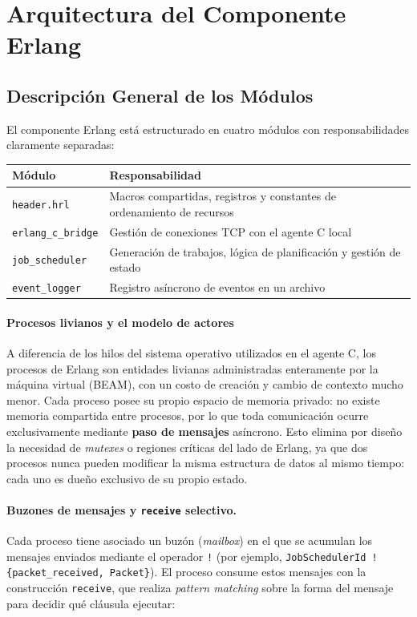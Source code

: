 \documentclass[12pt,a4paper]{article}
\begin{document}
\section{Arquitectura del Componente Erlang}

\subsection{Descripción General de los Módulos}
 
El componente Erlang está estructurado en cuatro módulos con responsabilidades claramente separadas:
 
\begin{center}
\begin{tabular}{ll}
\toprule
\textbf{Módulo} & \textbf{Responsabilidad} \\
\midrule
\texttt{header.hrl}         & Macros compartidas, registros y constantes de ordenamiento de recursos \\
\texttt{erlang\_c\_bridge}  & Gestión de conexiones TCP con el agente C local \\
\texttt{job\_scheduler}     & Generación de trabajos, lógica de planificación y gestión de estado \\
\texttt{event\_logger}      & Registro asíncrono de eventos en un archivo \\
\bottomrule
\end{tabular}
\end{center}

\paragraph{Procesos livianos y el modelo de actores}
A diferencia de los hilos del sistema operativo utilizados en el agente C, los procesos de Erlang son entidades livianas administradas enteramente por la máquina virtual (BEAM), con un costo de creación y cambio de contexto mucho menor. Cada proceso posee su propio espacio de memoria privado: no existe memoria compartida entre procesos, por lo que toda comunicación ocurre exclusivamente mediante \textbf{paso de mensajes} asíncrono. Esto elimina por diseño la necesidad de \emph{mutexes} o regiones críticas del lado de Erlang, ya que dos procesos nunca pueden modificar la misma estructura de datos al mismo tiempo: cada uno es dueño exclusivo de su propio estado.
 
\paragraph{Buzones de mensajes y \texttt{receive} selectivo.}
Cada proceso tiene asociado un buzón (\emph{mailbox}) en el que se acumulan los mensajes enviados mediante el operador \texttt{!} (por ejemplo, \texttt{JobSchedulerId ! \{packet\_received, Packet\}}). El proceso consume estos mensajes con la construcción \texttt{receive}, que realiza \emph{pattern matching} sobre la forma del mensaje para decidir qué cláusula ejecutar:
 
\end{document}
